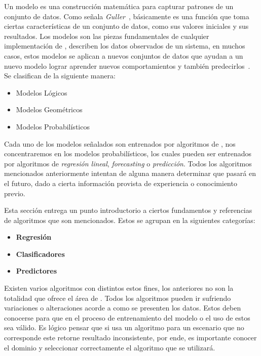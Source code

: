 Un modelo es una construcción matemática para capturar patrones de un conjunto de datos. Como señala \emph{Guller}~\MLGuller, básicamente es una función que toma ciertas características de un conjunto de datos, como sus valores iniciales y sus resultados.  Los modelos son las piezas fundamentales de cualquier implementación de \machinelearning, describen los datos observados de un sistema, en muchos casos, estos modelos se aplican a nuevos conjuntos de datos que ayudan a un nuevo modelo lograr aprender nuevos comportamientos y también predecirlos~\MLPDASunila. Se clasifican de la siguiente manera:

\begin{itemize}
\menorEspacioItemize		
 \item Modelos Lógicos
 \item Modelos Geométricos
 \item Modelos Probabilísticos
\end{itemize} 

Cada uno de los modelos señalados son entrenados por algoritmos de \machinelearning, nos concentraremos en los modelos probabilísticos, los cuales pueden ser entrenados por algoritmos de \emph{regresión lineal}, \emph{forecasting} o \emph{predicción}. Todos los algoritmos mencionados anteriormente intentan de alguna manera determinar que pasará en el futuro, dado a cierta información provista de experiencia o conocimiento previo.

Esta sección entrega un punto introductorio a ciertos fundamentos y referencias de algoritmos que son mencionados. Estos se agrupan en la siguientes categorías:

\begin{itemize}
	\menorEspacioItemize
	\item \textbf{Regresión}
			
	\item \textbf{Clasificadores}	
			
	\item \textbf{Predictores}
			
\end{itemize}
 
\uncm


Existen varios algoritmos con distintos estos fines, los anteriores no son la totalidad que ofrece el área de  \machinelearning. Todos los algoritmos pueden ir sufriendo variaciones o alteraciones acorde a como se presenten los datos. Estos deben conocerse para que en el proceso de entrenamiento del  modelo o el uso de estos sea válido. Es lógico pensar que si usa un algoritmo para un escenario que no corresponde este retorne resultado inconsistente, por ende, es importante conocer el dominio y seleccionar correctamente el algoritmo que se utilizará.


